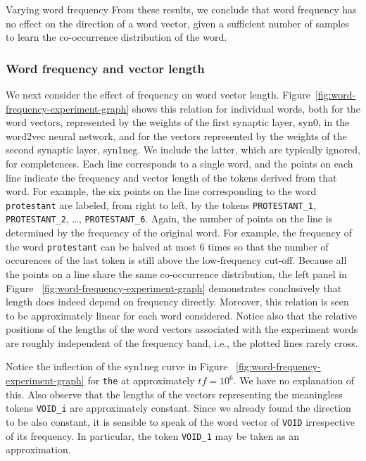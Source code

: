 \documentclass{article} %
\newcommand{\word}[1]{\texttt{#1}}
\begin{document}
\begin{section}{Varying word frequency}
From these results, we conclude that word frequency has no effect on the
direction of a word vector, given a sufficient number of samples to
learn the co-occurrence distribution of the word.

\subsubsection{Word frequency and vector length}
%
We next consider the effect of frequency on word vector length.
Figure~\ref{fig:word-frequency-experiment-graph} shows this relation for
individual words, both for the word vectors, represented by the weights
of the first synaptic layer, syn0, in the word2vec neural network, and
for the vectors represented by the weights of the second synaptic layer,
syn1neg.  We include the latter, which are typically ignored, for
completeness.  Each line corresponds to a single word, and the points on
each line indicate the frequency and vector length of the tokens derived
from that word.  For example, the six points on the line corresponding
to the word \word{protestant} are labeled, from right to left, by the
tokens \word{PROTESTANT\_1}, \word{PROTESTANT\_2}, \dots,
\word{PROTESTANT\_6}.  Again, the number of points on the line is
determined by the frequency of the original word.  For example, the
frequency of the word \word{protestant} can be halved at most $6$ times
so that the number of occurences of the last token is still above the
low-frequency cut-off.  Because all the points on a line share the same
co-occurrence distribution, the left panel in
Figure ~\ref{fig:word-frequency-experiment-graph} demonstrates conclusively
that length does indeed depend on frequency directly.  Moreover, this
relation is seen to be approximately linear for each word considered.
Notice also that the relative positions of the lengths of the word vectors associated
with the experiment words are roughly independent of the frequency band,
i.e., the plotted lines rarely cross.

Notice the inflection of the syn1neg curve in
Figure ~\ref{fig:word-frequency-experiment-graph} for \word{the} at
approximately $tf=10^6$.  We have no explanation of this.  Also observe
that the lengths of the vectors representing the meaningless tokens
\word{VOID\_i} are approximately constant.  Since we already found the
direction to be also constant, it is sensible to speak of the word
vector of \word{VOID} irrespective of its frequency.  In particular, the
token \word{VOID\_1} may be taken as an approximation.


\end{section}
\end{document}
